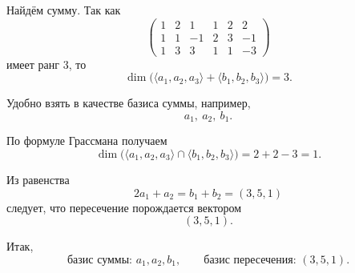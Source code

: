 \begin{enumerate}
Найдём сумму. Так как
\[
\begin{pmatrix}
    1 & 2 & 1 & 1 & 2 & 2 \\
    1 & 1 & -1 & 2 & 3 & -1 \\
    1 & 3 & 3 & 1 & 1 & -3
\end{pmatrix}
\]
имеет ранг 3, то
\[
\dim\bigl(\langle a_1,a_2,a_3\rangle+\langle b_1,b_2,b_3\rangle\bigr)=3.
\]

Удобно взять в качестве базиса суммы, например,
\[
a_1,\ a_2,\ b_1.
\]

По формуле Грассмана получаем
\[
\dim\bigl(\langle a_1,a_2,a_3\rangle\cap\langle b_1,b_2,b_3\rangle\bigr)=2+2-3=1.
\]

Из равенства
\[
2a_1+a_2=b_1+b_2=(3,5,1)
\]
следует, что пересечение порождается вектором
\[
(3,5,1).
\]

Итак,
\[
\text{базис суммы: } a_1,a_2,b_1,
\qquad
\text{базис пересечения: } (3,5,1).
\]

\end{enumerate}
